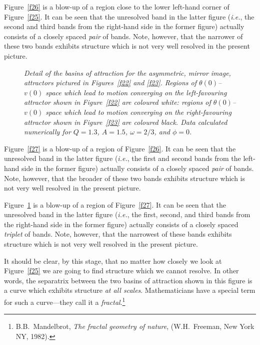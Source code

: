 Figure~\ref{f26} is a blow-up of a region close to the lower left-hand corner of Figure~\ref{f25}. 
It can be seen that the unresolved band in the latter figure ({\em i.e.}, the second and
third bands from the right-hand side in the former figure) actually consists of a closely spaced 
{\em pair}\/ of bands. 
Note, however, that the narrower of these two bands exhibits structure which is not very well resolved in the
present picture. 

\begin{figure}
\epsfysize=3.5in
\centerline{}
\caption{\em  Detail of the basins of attraction for the asymmetric, mirror image, attractors
pictured in Figures~\ref{f22} and \ref{f23}. Regions of $\theta(0)$--$v(0)$
space which lead to motion converging on the left-favouring attractor shown
in Figure~\ref{f22} are coloured white: regions of $\theta(0)$--$v(0)$
space which lead to motion converging on the right-favouring attractor shown
in Figure~\ref{f23} are coloured black. Data calculated numerically
for $Q=1.3$, $A=1.5$, $\omega=2/3$, and $\phi=0$.
}\label{f28}
\end{figure}

Figure~\ref{f27} is a blow-up of a region of Figure~\ref{f26}. 
It can be seen that the unresolved band in the latter figure ({\em i.e.}, the first and
second bands from the left-hand side in the former figure) actually consists of a closely spaced 
{\em pair} of bands. 
Note, however, that the broader of these two bands exhibits structure which is not very well resolved in the
present picture. 

Figure~\ref{f28} is a blow-up of a region of Figure~\ref{f27}. 
It can be seen that the unresolved band in the latter figure ({\em i.e.}, the first, second, and third
bands from the right-hand side in the former figure) actually consists of a closely spaced 
{\em triplet}\/ of bands. 
Note, however, that the narrowest of these  bands exhibits structure which is not very well resolved in the
present picture. 

It should be clear, by this stage, that no matter how closely we look at Figure~\ref{f25} we are
going to find structure which  we cannot resolve. In other words, the separatrix between the two
basins of attraction shown in this figure is a curve which exhibits structure {\em at all
scales}. Mathematicians have a special term for such a curve---they call it a 
{\em fractal}.\footnote{B.B.~Mandelbrot, {\em The fractal geometry of nature}, (W.H.~Freeman, 
New York NY, 1982).}

